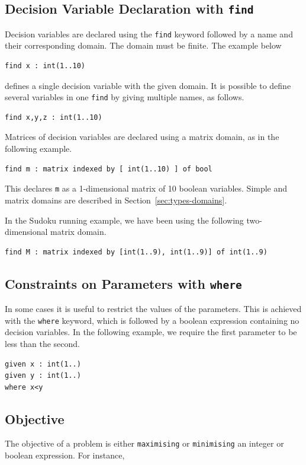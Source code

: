 \documentclass[a4paper]{article}
\begin{document}
\subsection{Decision Variable Declaration with {\tt find}}

Decision variables are declared using the {\tt find} keyword followed by a name and their
corresponding domain. The domain must be finite. The example below
\begin{verbatim}
find x : int(1..10)
\end{verbatim}
defines a single decision variable with the given domain. 
It is possible to define several variables in one \texttt{find} by giving multiple
names, as follows. 

\begin{verbatim}
find x,y,z : int(1..10)
\end{verbatim}

Matrices of decision variables are declared using a matrix domain, as in the following example. 

\begin{verbatim}
find m : matrix indexed by [ int(1..10) ] of bool
\end{verbatim}

This declares \texttt{m} as a 1-dimensional matrix of 10 boolean variables. Simple and matrix
domains are described in Section~\ref{sec:types-domains}.

In the Sudoku running example, we have been using the following two-dimensional matrix domain.

\begin{verbatim}
find M : matrix indexed by [int(1..9), int(1..9)] of int(1..9)
\end{verbatim}

\subsection{Constraints on Parameters with {\tt where}}

In some cases it is useful to restrict the values of the parameters. This is
achieved with the \texttt{where} keyword, which is followed by a boolean expression
containing no decision variables. In the following example, we require the first
parameter to be less than the second. 

\begin{verbatim}
given x : int(1..)
given y : int(1..)
where x<y
\end{verbatim}


\subsection{Objective}
The objective of a problem is either {\tt maximising} or 
{\tt minimising} an integer or boolean expression. For instance,
\end{document}

